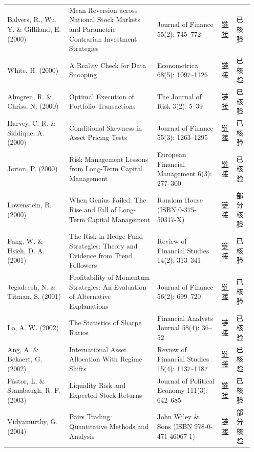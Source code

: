 \begin{longtable}{@{}>{\raggedright\arraybackslash}p{2.55cm}>{\raggedright\arraybackslash}p{4.7cm}>{\raggedright\arraybackslash}p{2.7cm}>{\raggedright\arraybackslash}p{1.9cm}>{\raggedright\arraybackslash}p{1.45cm}@{}}
Balvers, R., Wu, Y. \& Gilliland, E. (2000) & Mean Reversion across National Stock Markets and Parametric Contrarian Investment Strategies & Journal of Finance 55(2): 745--772 & \href{https://doi.org/10.1111/0022-1082.00225}{链接} & 已核验 \\
White, H. (2000) & A Reality Check for Data Snooping & Econometrica 68(5): 1097--1126 & \href{https://doi.org/10.1111/1468-0262.00152}{链接} & 已核验 \\
Almgren, R. \& Chriss, N. (2000) & Optimal Execution of Portfolio Transactions & The Journal of Risk 3(2): 5--39 & \href{https://doi.org/10.21314/jor.2001.041}{链接} & 已核验 \\
Harvey, C. R. \& Siddique, A. (2000) & Conditional Skewness in Asset Pricing Tests & Journal of Finance 55(3): 1263--1295 & \href{https://doi.org/10.1111/0022-1082.00247}{链接} & 已核验 \\
Jorion, P. (2000) & Risk Management Lessons from Long-Term Capital Management & European Financial Management 6(3): 277--300 & \href{https://doi.org/10.1111/1468-036X.00125}{链接} & 已核验 \\
Lowenstein, R. (2000) & When Genius Failed: The Rise and Fall of Long-Term Capital Management & Random House (ISBN 0-375-50317-X) & \href{https://www.randomhousebooks.com/}{链接} & 部分核验 \\
Fung, W. \& Hsieh, D. A. (2001) & The Risk in Hedge Fund Strategies: Theory and Evidence from Trend Followers & Review of Financial Studies 14(2): 313--341 & \href{https://doi.org/10.1093/rfs/14.2.313}{链接} & 已核验 \\
Jegadeesh, N. \& Titman, S. (2001) & Profitability of Momentum Strategies: An Evaluation of Alternative Explanations & Journal of Finance 56(2): 699--720 & \href{https://doi.org/10.1111/0022-1082.00342}{链接} & 已核验 \\
Lo, A. W. (2002) & The Statistics of Sharpe Ratios & Financial Analysts Journal 58(4): 36--52 & \href{https://doi.org/10.2469/faj.v58.n4.2453}{链接} & 已核验 \\
Ang, A. \& Bekaert, G. (2002) & International Asset Allocation With Regime Shifts & Review of Financial Studies 15(4): 1137--1187 & \href{https://doi.org/10.1093/rfs/15.4.1137}{链接} & 已核验 \\
Pástor, Ľ. \& Stambaugh, R. F. (2003) & Liquidity Risk and Expected Stock Returns & Journal of Political Economy 111(3): 642--685 & \href{https://doi.org/10.1086/374184}{链接} & 已核验 \\
Vidyamurthy, G. (2004) & Pairs Trading: Quantitative Methods and Analysis & John Wiley \& Sons (ISBN 978-0-471-46067-1) & \href{https://www.wiley.com/}{链接} & 部分核验 \\

\end{longtable}
